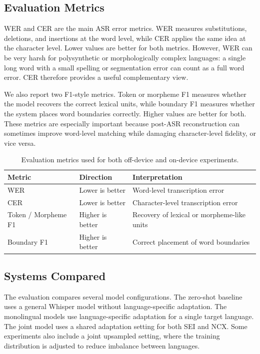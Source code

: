 \documentclass[11pt]{article}
\begin{document}
\subsection{Evaluation Metrics}

WER and CER are the main ASR error metrics. WER measures substitutions, deletions, and insertions at the word level, while CER applies the same idea at the character level. Lower values are better for both metrics. However, WER can be very harsh for polysynthetic or morphologically complex languages: a single long word with a small spelling or segmentation error can count as a full word error. CER therefore provides a useful complementary view.

We also report two F1-style metrics. Token or morpheme F1 measures whether the model recovers the correct lexical units, while boundary F1 measures whether the system places word boundaries correctly. Higher values are better for both. These metrics are especially important because post-ASR reconstruction can sometimes improve word-level matching while damaging character-level fidelity, or vice versa.

\begin{table}[h]
\centering
\small
\begin{tabular}{lll}
\hline
\textbf{Metric} & \textbf{Direction} & \textbf{Interpretation} \\
\hline
WER & Lower is better & Word-level transcription error \\
CER & Lower is better & Character-level transcription error \\
Token / Morpheme F1 & Higher is better & Recovery of lexical or morpheme-like units \\
Boundary F1 & Higher is better & Correct placement of word boundaries \\
\hline
\end{tabular}
\caption{Evaluation metrics used for both off-device and on-device experiments.}
\label{tab:metrics}
\end{table}

\subsection{Systems Compared}

The evaluation compares several model configurations. The zero-shot baseline uses a general Whisper model without language-specific adaptation. The monolingual models use language-specific adaptation for a single target language. The joint model uses a shared adaptation setting for both SEI and NCX. Some experiments also include a joint upsampled setting, where the training distribution is adjusted to reduce imbalance between languages.
\end{document}
